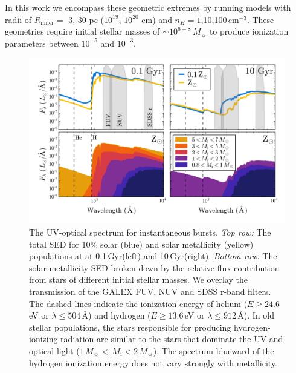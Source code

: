 \documentclass[preprint2]{aastex62}
\newcommand\Msun{\ensuremath{\,M_{\sun}}\xspace}
\newcommand\Mi{\ensuremath{\,M_{\mathrm{i}}}\xspace}
\newcommand{\ang}{\ensuremath{\mbox{\AA}}\xspace}
\newcommand{\Gyr}{$\,$Gyr\xspace}
\begin{document}
In this work we encompass these geometric extremes by running models with radii of $R_{\mathrm{inner}} =$ 3, 30 pc ($10^{19}$, $10^{20}$ cm) and $n_{H}=1$,10,100$\,$cm$^{-3}$. These geometries require initial stellar masses of ${\sim}10^{6-8}\Msun$ to produce ionization parameters between $10^{-5}$ and $10^{-3}$.

\begin{figure}[ht]
  \begin{center}
    \includegraphics[width=\linewidth]{figs/f1.png}
    \caption{{\sc The UV-optical spectrum for instantaneous bursts.} \emph{Top row:} The total SED for 10\% solar (blue) and solar metallicity (yellow) populations at at 0.1\Gyr (left) and 10\Gyr (right). \emph{Bottom row:} The solar metallicity SED broken down by the relative flux contribution from stars of different initial stellar masses. We overlay the transmission of the GALEX FUV, NUV and SDSS r-band filters. The dashed lines indicate the ionization energy of helium ($E\geq24.6\,$eV or $\lambda \leq 504\,$\ang) and hydrogen ($E\geq13.6\,$eV or $\lambda \leq 912\,$\ang). In old stellar populations, the stars responsible for producing hydrogen-ionizing radiation are similar to the stars that dominate the UV and optical light ($1\Msun < \Mi < 2\Msun$). The spectrum blueward of the hydrogen ionization energy does not vary strongly with metallicity.}
    \label{fig:ionSpec}
  \end{center}
\end{figure}
\end{document}
